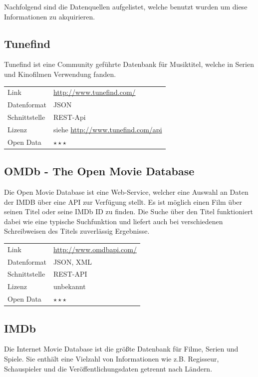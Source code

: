 \documentclass[parskip]{scrartcl}
\begin{document}
Nachfolgend sind die Datenquellen aufgelistet, welche benutzt wurden um diese Informationen zu akquirieren.

\subsection{Tunefind}
\label{subsec:tunefind}

Tunefind ist eine Community geführte Datenbank für Musiktitel, welche in Serien und Kinofilmen Verwendung fanden.

\begin{tabular}{l|p{9cm}}
	Link & \url{http://www.tunefind.com/} \\
 	Datenformat & JSON \\
 	Schnittstelle & REST-Api \\
 	Lizenz & siehe \url{http://www.tunefind.com/api} \\
 	Open Data & $\star\star\star$ \\
\end{tabular}

\subsection{OMDb - The Open Movie Database}

Die Open Movie Database ist eine Web-Service, welcher eine Auswahl an Daten der IMDB über eine API zur Verfügung stellt. Es ist möglich einen Film über seinen  Titel oder seine IMDb ID zu finden. Die Suche über den Titel funktioniert dabei wie eine typische Suchfunktion und liefert auch bei verschiedenen Schreibweisen des Titels zuverlässig Ergebnisse.

\begin{tabular}{l|p{9cm}}
    Link & \url{http://www.omdbapi.com/} \\
    Datenformat & JSON, XML \\
    Schnittstelle & REST-API \\
    Lizenz & unbekannt \\
    Open Data & $\star\star\star$ \\
\end{tabular}

\subsection{IMDb}

Die Internet Movie Database ist die größte Datenbank für Filme, Serien und Spiele. Sie enthält eine Vielzahl von Informationen wie z.B. Regisseur, Schauspieler und die Veröffentlichungsdaten getrennt nach Ländern.
\end{document}
